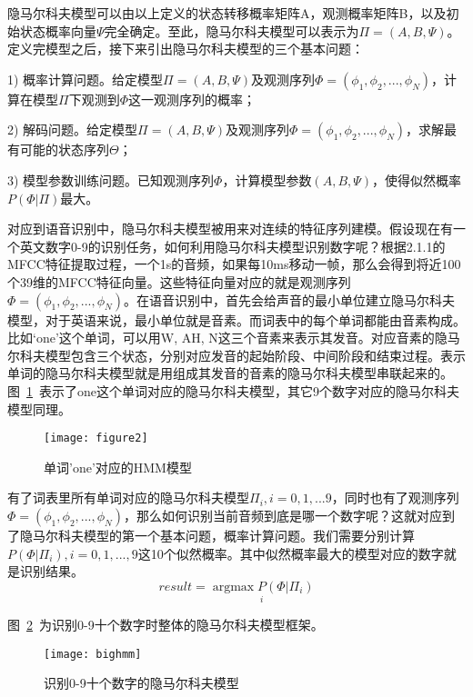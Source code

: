隐马尔科夫模型可以由以上定义的状态转移概率矩阵A，观测概率矩阵B，以及初始状态概率向量$\Psi$完全确定。至此，隐马尔科夫模型可以表示为$\Pi=(A,B,\Psi)$。定义完模型之后，接下来引出隐马尔科夫模型的三个基本问题：

1) 概率计算问题。给定模型$\Pi=(A,B,\Psi)$及观测序列$\Phi=(\phi_1,\phi_2,...,\phi_N)$，计算在模型$\Pi$下观测到$\Phi$这一观测序列的概率；

2) 解码问题。给定模型$\Pi=(A,B,\Psi)$及观测序列$\Phi=(\phi_1,\phi_2,...,\phi_N)$，求解最有可能的状态序列$\Theta$；

3) 模型参数训练问题。已知观测序列$\Phi$，计算模型参数$(A,B,\Psi)$，使得似然概率$P(\Phi|\Pi)$最大。

对应到语音识别中，隐马尔科夫模型被用来对连续的特征序列建模。假设现在有一个英文数字0-9的识别任务，如何利用隐马尔科夫模型识别数字呢？根据2.1.1的MFCC特征提取过程，一个1s的音频，如果每10ms移动一帧，那么会得到将近100个39维的MFCC特征向量。这些特征向量对应的就是观测序列$\Phi=(\phi_1,\phi_2,...,\phi_N)$。在语音识别中，首先会给声音的最小单位建立隐马尔科夫模型，对于英语来说，最小单位就是音素。而词表中的每个单词都能由音素构成。比如‘one’这个单词，可以用W, AH, N这三个音素来表示其发音。对应音素的隐马尔科夫模型包含三个状态，分别对应发音的起始阶段、中间阶段和结束过程。表示单词的隐马尔科夫模型就是用组成其发音的音素的隐马尔科夫模型串联起来的。图~\ref{fig:figure2}~表示了one这个单词对应的隐马尔科夫模型，其它9个数字对应的隐马尔科夫模型同理。
\begin{figure}[htbp]
\centering
\texttt{[image: figure2]}
\caption{单词'one'对应的HMM模型}\label{fig:figure2}
\vspace{\baselineskip}
\end{figure}

有了词表里所有单词对应的隐马尔科夫模型$\Pi_i,i=0,1,...9$，同时也有了观测序列$\Phi=(\phi_1,\phi_2,...,\phi_N)$，那么如何识别当前音频到底是哪一个数字呢？这就对应到了隐马尔科夫模型的第一个基本问题，概率计算问题。我们需要分别计算$P(\Phi|\Pi_i), i=0,1,...,9$这10个似然概率。其中似然概率最大的模型对应的数字就是识别结果。\begin{equation}result=\underset{i}{\operatorname{argmax} P(\Phi|\Pi_i)} \end{equation}

图~\ref{fig:bighmm}~为识别0-9十个数字时整体的隐马尔科夫模型框架。
\begin{figure}[htbp]
\centering
\texttt{[image: bighmm]}
\caption{识别0-9十个数字的隐马尔科夫模型}\label{fig:bighmm}
\vspace{\baselineskip}
\end{figure}

